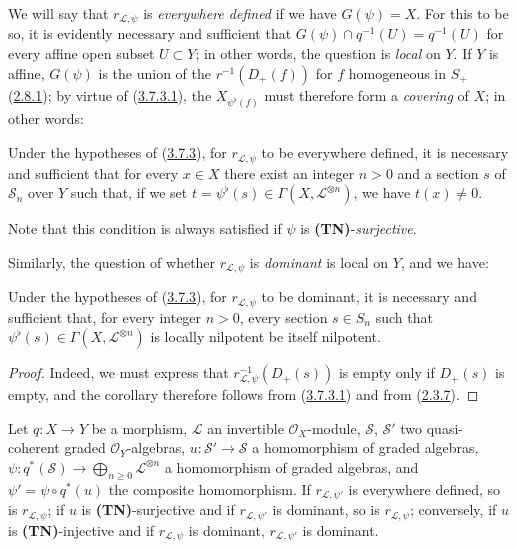 We will say that $r_{\mathcal{L},\psi}$ is \emph{everywhere defined} if we have
$G(\psi)=X$. For this to be so, it is evidently necessary and sufficient that
$G(\psi)\cap q^{-1}(U)=q^{-1}(U)$ for every affine open subset $U\subset Y$;
in other words, the question is \emph{local} on $Y$. If $Y$ is affine,
$G(\psi)$ is the union of the $r^{-1}(D_+(f))$ for $f$ homogeneous in $S_+$
(\hyperref[II.2.8.1]{2.8.1}); by virtue of
(\hyperref[II.3.7.3.1]{3.7.3.1}), the $X_{\psi^\flat(f)}$ must therefore
form a \emph{covering} of $X$; in other words:

\begin{corollary}[3.7.4]
\label{II.3.7.4}
Under the hypotheses of \textup{(\hyperref[II.3.7.3]{3.7.3})}, for
$r_{\mathcal{L},\psi}$ to be everywhere defined, it is necessary and sufficient
that for every $x\in X$ there exist an integer $n>0$ and a section $s$ of
$\mathcal{S}_n$ over $Y$ such that, if we set
$t=\psi^\flat(s)\in\Gamma(X,\mathcal{L}^{\otimes n})$, we have $t(x)\neq0$.
\end{corollary}


Note that this condition is always satisfied if $\psi$ is
\textbf{(TN)}-\emph{surjective}.

Similarly, the question of whether $r_{\mathcal{L},\psi}$ is \emph{dominant}
is local on $Y$, and we have:

\begin{corollary}[3.7.5]
\label{II.3.7.5}
Under the hypotheses of \textup{(\hyperref[II.3.7.3]{3.7.3})}, for
$r_{\mathcal{L},\psi}$ to be dominant, it is necessary and sufficient that, for
every integer $n>0$, every section $s\in S_n$ such that
$\psi^\flat(s)\in\Gamma(X,\mathcal{L}^{\otimes n})$ is locally
nilpotent be itself nilpotent.
\end{corollary}

\begin{proof}
Indeed, we must express that
$r_{\mathcal{L},\psi}^{-1}(D_+(s))$ is empty only if $D_+(s)$ is empty,
and the corollary therefore follows from
(\hyperref[II.3.7.3.1]{3.7.3.1}) and from
(\hyperref[II.2.3.7]{2.3.7}).
\end{proof}

\begin{proposition}[3.7.6]
\label{II.3.7.6}
Let $q:X\to Y$ be a morphism, $\mathcal{L}$ an invertible
$\mathcal{O}_X$-module, $\mathcal{S}$, $\mathcal{S}'$ two quasi-coherent graded
$\mathcal{O}_Y$-algebras,
$u:\mathcal{S}'\to\mathcal{S}$ a homomorphism of graded algebras,
$\psi:q^*(\mathcal{S})\to\bigoplus_{n\geq0}\mathcal{L}^{\otimes n}$ a
homomorphism of graded algebras, and
$\psi'=\psi\circ q^*(u)$ the composite homomorphism. If
$r_{\mathcal{L},\psi'}$ is everywhere defined, so is
$r_{\mathcal{L},\psi}$; if $u$ is \textup{\textbf{(TN)}}-surjective and if
$r_{\mathcal{L},\psi'}$ is dominant, so is
$r_{\mathcal{L},\psi}$; conversely, if $u$ is \textup{\textbf{(TN)}}-injective and if
$r_{\mathcal{L},\psi}$ is dominant, $r_{\mathcal{L},\psi'}$ is dominant.
\end{proposition}

